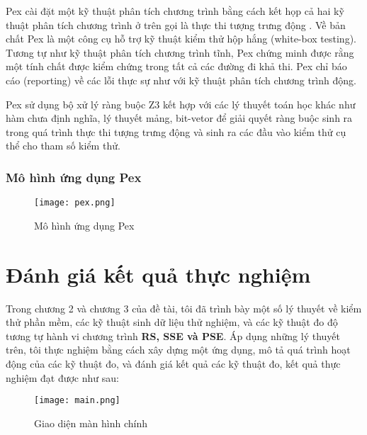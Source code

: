 Pex cài đặt một kỹ thuật phân tích chương trình bằng cách kết họp cả hai kỹ thuật phân tích chương trình ở trên gọi là thực thi tượng trưng động \cite{xie2009fitness, godefroid2005dart}. Về bản chất Pex là một công cụ hỗ trợ kỹ thuật kiểm thử hộp hắng (white-box testing). Tương tự như kỹ thuật phân tích chương trình tĩnh, Pex chứng minh được rằng một tính chất được kiểm chứng trong tất cả các đường đi khả thi. Pex chỉ báo cáo (reporting) về các lỗi thực sự như với kỹ thuật phân tích chương trình động.

Pex sử dụng bộ xử lý ràng buộc Z3 \cite{de2008z3} kết hợp với các lý thuyết toán học khác như hàm chưa định nghĩa, lý thuyết mảng, bit-vetor \cite{kroening2016decision} để giải quyết ràng buộc sinh ra trong quá trình thực thi tượng trưng động và sinh ra các đầu vào kiểm thử cụ thể cho tham số kiểm thử.

\subsubsection*{Mô hình ứng dụng Pex}

\begin{center}
	\begin{figure}[htp]
		\begin{center}
			\texttt{[image: pex.png]}
		\end{center}
		\caption{Mô hình ứng dụng Pex}
		
	\end{figure}
\end{center}

\section{Đánh giá kết quả thực nghiệm}
Trong chương 2 và chương 3 của đề tài, tôi đã trình bày một số lý thuyết về kiểm thử phần mềm, các kỹ thuật sinh dữ liệu thử nghiệm, và các kỹ thuật đo độ tương tự hành vi chương trình \textbf{RS, SSE và PSE}. Áp dụng những lý thuyết trên, tôi thực nghiệm bằng cách xây dựng một ứng dụng, mô tả quá trình hoạt động của các kỹ thuật đo, và đánh giá kết quả các kỹ thuật đo, kết quả thực nghiệm đạt được như sau:

\begin{center}
	\begin{figure}[htp]
		\begin{center}
			\texttt{[image: main.png]}
		\end{center}
		\caption{Giao diện màn hình chính}		
	\end{figure}
\end{center}

